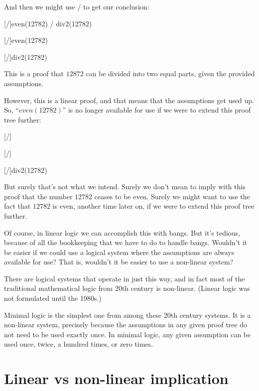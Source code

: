 \documentclass[../../../main.tex]{subfiles}
\begin{document}
\noindent
And then we might use \lolliElim/ to get our conclusion:

\begin{prooftree*}
  \hypo{}
  [\startrule/]{even(12782) \lolli/ div2(12782)}
  
  \hypo{}
  [\startrule/]{even(12782)}
  
  [\lolliElim/]{div2(12782)}
\end{prooftree*}

\noindent
This is a proof that $12872$ can be divided into two equal parts, given the provided assumptions.

However, this is a linear proof, and that means that the assumptions get used up. So, ``$even(12782)$'' is no longer available for use if we were to extend this proof tree further:

\begin{prooftree*}
  \hypo{}
  [\startrule/]{}
  
  \hypo{}
  [\startrule/]{}
  
  [\lolliElim/]{div2(12782)}
\end{prooftree*}

\noindent
But surely that's not what we intend. Surely we don't mean to imply with this proof that the number $12782$ ceases to be even. Surely we might want to use the fact that $12782$ is even, another time later on, if we were to extend this proof tree further.

Of course, in linear logic we can accomplish this with bangs. But it's tedious, because of all the bookkeeping that we have to do to handle bangs. Wouldn't it be easier if we could use a logical system where the assumptions are always available for use? That is, wouldn't it be easier to use a non-linear system?

There are logical systems that operate in just this way, and in fact most of the traditional mathematical logic from 20th century is non-linear. (Linear logic was not formulated until the 1980s.)

Minimal logic is the simplest one from among these 20th century systems. It is a non-linear system, precisely because the assumptions in any given proof tree do not need to be used exactly once. In minimal logic, any given assumption can be used once, twice, a hundred times, or zero times. 


\section{Linear vs non-linear implication}
\end{document}
